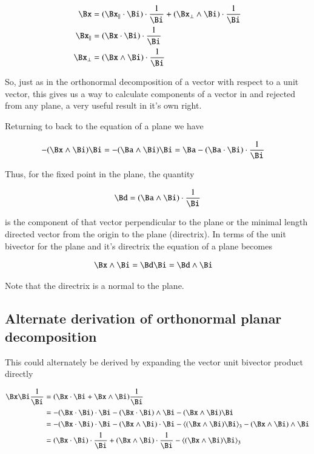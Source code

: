\documentclass{article}
\begin{document}
\begin{align*}
\Bx 
&= 
(\Bx_\parallel \cdot \Bi) \cdot \frac{1}{\Bi} + (\Bx_\perp \wedge \Bi) \cdot \frac{1}{\Bi} \\
\Bx_\parallel &= (\Bx \cdot \Bi) \cdot \frac{1}{\Bi} \\
\Bx_\perp &= (\Bx \wedge \Bi) \cdot \frac{1}{\Bi} \\
\end{align*}

So, just as in the orthonormal decomposition of a vector with respect to a
unit vector, this gives us a way to calculate components of a vector
in and rejected from any plane, a very useful result in it's own right.

Returning to back to the equation of a plane we have

\begin{align*}
- (\Bx \wedge \Bi)\Bi &= - (\Ba \wedge \Bi)\Bi = \Ba - (\Ba \cdot \Bi) \cdot \frac{1}{\Bi}
\end{align*}

Thus, for the fixed point in the plane, the quantity

\[
\Bd = (\Ba \wedge \Bi) \cdot \frac{1}{\Bi}
\]

is the component of that vector perpendicular to the plane or the minimal length directed vector from the origin to the plane (directrix).  In terms 
of the unit bivector for the plane and it's directrix the equation of a 
plane becomes

\begin{align*}
\Bx \wedge \Bi &= \Bd \Bi = \Bd \wedge \Bi
\end{align*}

Note that the directrix is a normal to the plane.

\subsection{ Alternate derivation of orthonormal planar decomposition }

This could alternately be derived by expanding the vector unit bivector
product directly

\begin{align*}
\Bx \Bi \frac{1}{\Bi} 
&= ( \Bx \cdot \Bi + \Bx \wedge \Bi ) \frac{1}{\Bi} \\
&= 
- {(\Bx \cdot \Bi) \cdot \Bi} - {(\Bx \cdot \Bi) \wedge \Bi} - {(\Bx \wedge \Bi) \Bi} \\
&= 
- {(\Bx \cdot \Bi) \cdot \Bi} - {(\Bx \wedge \Bi) \cdot \Bi } - {\left<(\Bx \wedge \Bi) \Bi\right>_3} - {(\Bx \wedge \Bi) \wedge \Bi} \\
&= 
{(\Bx \cdot \Bi) \cdot \frac{1}{\Bi}} + {(\Bx \wedge \Bi) \cdot \frac{1}{\Bi}} - {\left<(\Bx \wedge \Bi) \Bi\right>_3} \\
\end{align*}
\end{document}
